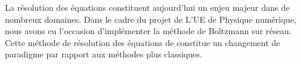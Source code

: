 La résolution des équations \NS{} constituent aujourd'hui un enjeu majeur dans de nombreux domaines.
Dans le cadre du projet de L'UE de Physique numérique, nous avons eu l'occasion d'implémenter la méthode de Boltzmann sur
réseau.
Cette méthode de résolution des équations de \NS{} constitue un changement de paradigme par rapport aux méthodes plus 
classiques.